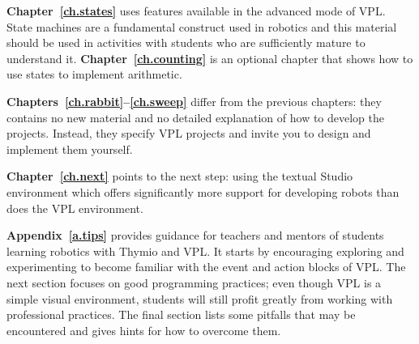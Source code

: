 \textbf{Chapter~\ref{ch.states}} uses features available in the advanced mode of VPL.
State machines are a fundamental construct used in robotics and this material
should be used in activities with students who are sufficiently mature to understand it.
\textbf{Chapter~\ref{ch.counting}} is an optional chapter that shows
how to use states to implement arithmetic.

\textbf{Chapters~\ref{ch.rabbit}--\ref{ch.sweep}} differ from the
previous chapters: they contains no new material and no detailed
explanation of how to develop the projects. Instead, they specify VPL
projects and invite you to design and implement them yourself.

\textbf{Chapter~\ref{ch.next}} points to the next step: using
the textual Studio environment which offers significantly more support for
developing robots than does the VPL environment.

\textbf{Appendix~\ref{a.tips}} provides guidance for teachers and mentors
of students learning robotics with Thymio and VPL.
It starts by encouraging exploring and experimenting
to become familiar with the event and action blocks of VPL.
The next section focuses on good programming practices;
even though VPL is a simple visual environment,
students will still profit greatly from working with
professional practices.
The final section lists some pitfalls that may be encountered
and gives hints for how to overcome them.
